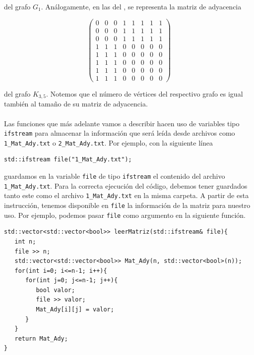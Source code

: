del grafo $G_1$. Análogamente, en las  del , se representa la matriz de adyacencia
\begin{ceqn}
\[
\begin{pmatrix}
   0 & 0 & 0 & 1 & 1 & 1 & 1 & 1 \\
   0 & 0 & 0 & 1 & 1 & 1 & 1 & 1 \\
   0 & 0 & 0 & 1 & 1 & 1 & 1 & 1 \\
   1 & 1 & 1 & 0 & 0 & 0 & 0 & 0 \\
   1 & 1 & 1 & 0 & 0 & 0 & 0 & 0 \\
   1 & 1 & 1 & 0 & 0 & 0 & 0 & 0 \\
   1 & 1 & 1 & 0 & 0 & 0 & 0 & 0 \\
   1 & 1 & 1 & 0 & 0 & 0 & 0 & 0
\end{pmatrix}
\]
\end{ceqn}
del grafo $K_{3,5}$. Notemos que el número de vértices del respectivo grafo es igual también al tamaño de su matriz de adyacencia.\\\\
Las funciones que más adelante vamos a describir hacen uso de variables tipo \texttt{ifstream} para almacenar la información que será leída desde archivos como \texttt{1\_Mat\_Ady.txt} o \texttt{2\_Mat\_Ady.txt}. Por ejemplo, con la siguiente línea
\begin{lstlisting}[caption={Almacenamiento de \texttt{1\_Mat\_Ady} en la variable \texttt{file}}, label={cod:alamcenar_en_ifstream}]
std::ifstream file("1_Mat_Ady.txt");
\end{lstlisting}
guardamos en la variable \texttt{file} de tipo \texttt{ifstream} el contenido del archivo \texttt{1\_Mat\_Ady.txt}. Para la correcta ejecución del código, debemos tener guardados tanto este como el archivo \texttt{1\_Mat\_Ady.txt} en la misma carpeta. A partir de esta instrucción, tenemos disponible en \texttt{file} la información de la matriz para nuestro uso. Por ejemplo, podemos pasar \texttt{file} como argumento en la siguiente función.
\begin{lstlisting}[caption={Función \texttt{leerMatriz}}, label={cod:leerMatriz}]
std::vector<std::vector<bool>> leerMatriz(std::ifstream& file){
   int n;
   file >> n;
   std::vector<std::vector<bool>> Mat_Ady(n, std::vector<bool>(n));
   for(int i=0; i<=n-1; i++){
      for(int j=0; j<=n-1; j++){
         bool valor;
         file >> valor;
         Mat_Ady[i][j] = valor;
      }
   }
   return Mat_Ady;
}\end{lstlisting}
